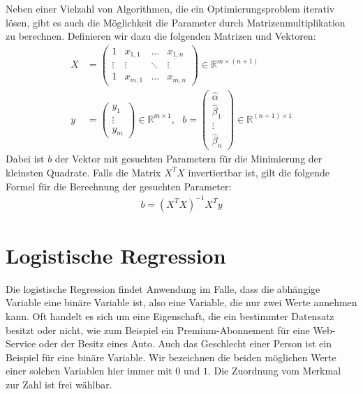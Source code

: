 Neben einer Vielzahl von Algorithmen, die ein Optimierungsproblem iterativ lösen, gibt es auch die Möglichkeit die Parameter durch Matrizenmultiplikation zu berechnen. Definieren wir dazu die folgenden Matrizen und Vektoren:
\begin{align*}
    X &= \begin{pmatrix}
        1 & x_{1, 1} & \dots & x_{1, n} \\
        \vdots & \vdots & \ddots & \vdots \\
        1 & x_{m, 1} & \dots & x_{m, n}
    \end{pmatrix} \in \mathbb{R}^{m \times (n + 1)} \\
    y &= \begin{pmatrix}
        y_1 \\
        \vdots \\
        y_m
    \end{pmatrix} \in \mathbb{R}^{m \times 1}, ~~~
    b = \begin{pmatrix}
        \hat\alpha \\
        \hat\beta_1 \\
        \vdots \\
        \hat\beta_n
    \end{pmatrix} \in \mathbb{R}^{(n + 1) \times 1}
\end{align*}
Dabei ist $b$ der Vektor mit gesuchten Parametern für die Minimierung der kleinsten Quadrate. Falls die Matrix $X^T X$ invertiertbar ist, gilt die folgende Formel für die Berechnung der gesuchten Parameter:
\begin{align*}
    b = (X^T X)^{-1} X^T y
\end{align*}

\section{Logistische Regression}

Die logistische Regression findet Anwendung im Falle, dass die abhängige Variable eine binäre Variable ist, also eine Variable, die nur zwei Werte annehmen kann. Oft handelt es sich um eine Eigenschaft, die ein bestimmter Datensatz besitzt oder nicht, wie zum Beispiel ein Premium-Abonnement für eine Web-Service oder der Besitz eines Auto. Auch das Geschlecht einer Person ist ein Beispiel für eine binäre Variable. Wir bezeichnen die beiden möglichen Werte einer solchen Variablen hier immer mit $0$ und $1$. Die Zuordnung vom Merkmal zur Zahl ist frei wählbar.

